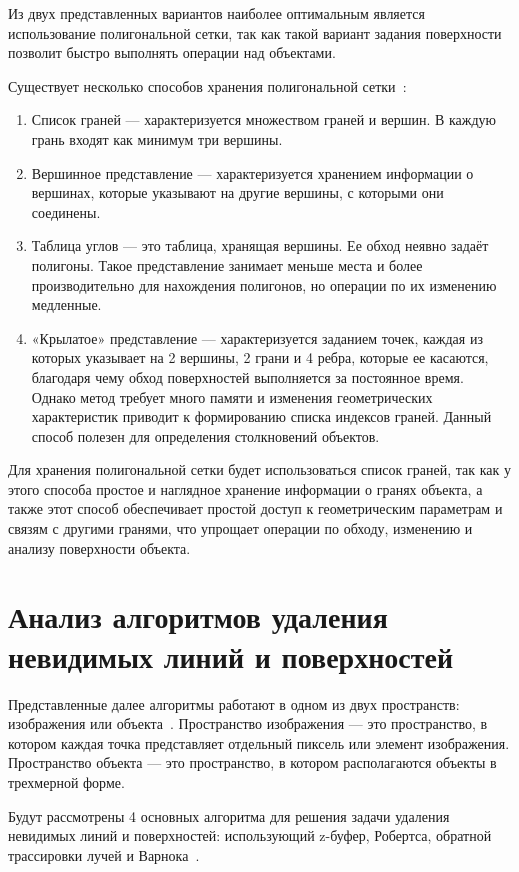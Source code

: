 Из двух представленных вариантов наиболее оптимальным является использование полигональной сетки, так как такой вариант задания поверхности позволит быстро выполнять операции над объектами.


Существует несколько способов хранения полигональной сетки~\cite{roders}:
\begin{enumerate}[label=\arabic*)]
	\item Список граней --- характеризуется множеством граней и вершин. В каждую грань входят как минимум три вершины. 
	\item Вершинное представление --- характеризуется хранением информации о вершинах, которые указывают на другие вершины, с которыми они соединены.
	\item Таблица углов --- это таблица, хранящая вершины. Ее обход неявно задаёт полигоны. Такое представление занимает меньше места и более производительно для нахождения полигонов, но операции по их изменению медленные.
    \item «Крылатое» представление --- характеризуется заданием точек, каждая из которых указывает на 2 вершины, 2 грани и 4 ребра, которые ее касаются, благодаря чему обход поверхностей выполняется за постоянное время. Однако метод требует много памяти и изменения геометрических характеристик приводит к формированию списка индексов граней. Данный способ полезен для определения столкновений объектов.
\end{enumerate}

Для хранения полигональной сетки будет использоваться список граней, так как у этого способа простое и наглядное хранение информации о гранях объекта, а также этот способ обеспечивает простой доступ к геометрическим параметрам и связям с другими гранями, что упрощает операции по обходу, изменению и анализу поверхности объекта.


\section{Анализ алгоритмов удаления невидимых линий и поверхностей}

Представленные далее алгоритмы работают в одном из двух пространств: изображения или объекта~\cite{roders}. Пространство изображения --- это пространство, в котором каждая точка представляет отдельный пиксель или элемент изображения. Пространство объекта --- это пространство, в котором располагаются объекты в трехмерной форме. 

Будут рассмотрены 4 основных алгоритма для решения задачи удаления невидимых линий и поверхностей: использующий z-буфер, Робертса, обратной трассировки лучей и Варнока~\cite{roders}.

